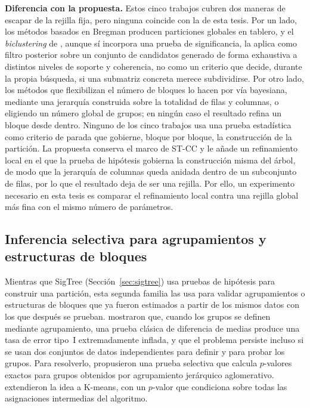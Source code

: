 \textbf{Diferencia con la propuesta.} Estos cinco trabajos cubren dos
maneras de escapar de la rejilla fija, pero ninguna coincide con la de esta
tesis. Por un lado, los métodos basados en Bregman producen particiones
globales en tablero, y el \emph{biclustering} de \cite{Neves2022}, aunque sí
incorpora una prueba de significancia, la aplica como filtro
posterior sobre un conjunto de candidatos generado de forma
exhaustiva a distintos niveles de soporte y coherencia, no como un criterio
que decide, durante la propia búsqueda, si una submatriz concreta merece
subdividirse. Por otro lado, los métodos que flexibilizan el número de
bloques lo hacen por vía bayesiana, mediante una jerarquía construida sobre
la totalidad de filas y columnas, o eligiendo un número global de
grupos; en ningún caso el resultado refina un bloque desde dentro.
Ninguno de los cinco trabajos usa una prueba estadística como criterio de
parada que gobierne, bloque por bloque, la construcción de la
partición. La propuesta conserva el marco de \ac{ST-CC} y le añade un
refinamiento local en el que la prueba de hipótesis gobierna la
construcción misma del árbol, de modo que la jerarquía de columnas queda anidada dentro
de un subconjunto de filas, por lo que el resultado deja de ser una
rejilla. Por ello, un experimento necesario en esta tesis es comparar el
refinamiento local contra una rejilla global más fina con el mismo número
de parámetros.

\subsection{Inferencia selectiva para agrupamientos y estructuras de bloques}
\label{sec:ea_inferencia}

Mientras que SigTree (Sección~\ref{sec:sigtree}) usa pruebas de
hipótesis para construir una partición, esta segunda familia las usa
para validar agrupamientos o estructuras de bloques que ya fueron
estimados a partir de los mismos datos con los que después se prueban.
\cite{Gao2024} mostraron que, cuando los grupos se definen mediante
agrupamiento, una prueba clásica de diferencia de medias produce una tasa de
error tipo~I extremadamente inflada, y que el problema persiste incluso si
se usan dos conjuntos de datos independientes para definir y para probar los
grupos. Para resolverlo, propusieron una prueba selectiva que calcula
$p$-valores exactos para grupos obtenidos por agrupamiento jerárquico
aglomerativo. \cite{Chen2023} extendieron la idea a K-means, con un
$p$-valor que condiciona sobre todas las asignaciones intermedias del
algoritmo.

